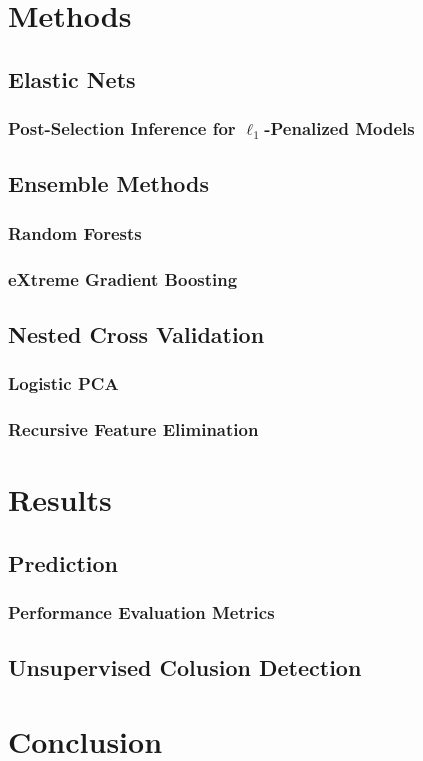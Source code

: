\documentclass[a4paper,12pt, headsepline]{scrartcl}
\numberwithin{equation}{section}
\begin{document}
\section{Methods}\label{sec:meth}
\subsection{Elastic Nets}\label{subsec:net}
\subsubsection{Post-Selection Inference for $\ell_1$-Penalized Models}\label{subsubsec:psi}
\subsection{Ensemble Methods}\label{subsec:ens}
\subsubsection{Random Forests}\label{subsubsec:rf}
\subsubsection{eXtreme Gradient Boosting}\label{subsubsec:xgb}
\subsection{Nested Cross Validation}\label{subsec:nest}
\subsubsection{Logistic PCA}\label{subsubsec:logp}
\subsubsection{Recursive Feature Elimination}\label{subsubsec:rfe}
\section{Results}\label{sec:res}
\subsection{Prediction}\label{subsec:pred}
\subsubsection{Performance Evaluation Metrics}\label{subsubsec:per}
\subsection{Unsupervised Colusion Detection}\label{subsec:col}
\section{Conclusion}\label{sec:con}
 
\newpage
\printbibliography
\end{document}
